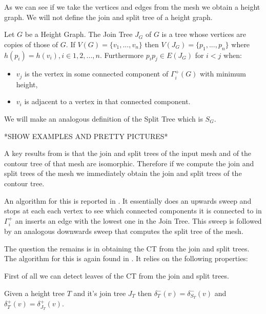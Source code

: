 As we can see if we take the vertices and edges from the mesh we obtain a height graph. We will not define the join and split tree of a height graph.

\begin{defn}

    Let $G$ be a Height Graph. The Join Tree $J_G$ of $G$ is a tree whose vertices are copies of those of $G$. If $V(G) = \{v_1, ..., v_n\}$ then $V(J_G) = \{p_1, ..., p_n\}$ where $h(p_i) = h(v_i), i \in 1, 2, ..., n$. Furthermore $p_ip_j \in E(J_G)$ for $i < j$ when:

\end{defn}

\begin{itemize}
    \item $v_j$ is the vertex in some connected component of $\Gamma_i^+(G)$ with minimum height,
    \item $v_i$ is adjacent to a vertex in that connected component.
\end{itemize}

We will make an analogous definition of the Split Tree which is $S_G$.

*SHOW EXAMPLES AND PRETTY PICTURES*

A key results from \cite{carr-masters} is that the join and split trees of the input mesh and of the contour tree of that mesh are isomorphic. Therefore if we compute the join and split trees of the mesh we immediately obtain the join and split trees of the contour tree.

An algorithm for this is reported in \cite{carr-masters}. It essentially does an upwards sweep and stops at each each vertex to see which connected components it is connected to in $\Gamma_i^+$ an inserts an edge with the lowest one in the Join Tree. This sweep is followed by an analogous downwards sweep that computes the split tree of the mesh.

The question the remains is in obtaining the CT from the join and split trees. The algorithm for this is again found in \cite{carr-masters}. It relies on the following properties:

First of all we can detect leaves of the CT from the join and split trees.



\begin{lem} Given a height tree $T$ and it's join tree $J_T$ then $\delta_{T}^-(v) = \delta_{S_T}^-(v)$ and $\delta_{T}^+(v) = \delta_{J_T}^+(v)$.\end{lem}


